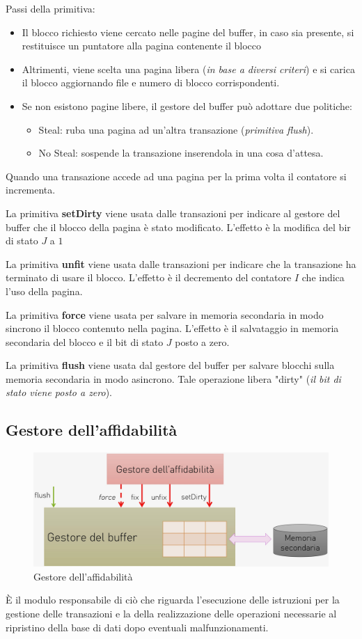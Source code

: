 \documentclass[oneside,a4paper,11pt]{book}
\theoremstyle{italicstyle}
\theoremstyle{normStyle}
\begin{document}
Passi della primitiva:
\begin{itemize}
    \item Il blocco richiesto viene cercato nelle pagine del buffer, in caso sia presente, si restituisce 
    un puntatore alla pagina contenente il blocco
    \item Altrimenti, viene scelta una pagina libera (\textit{in base a diversi criteri}) 
    e si carica il blocco aggiornando 
    file e numero di blocco corrispondenti.
    \item Se non esistono pagine libere, il gestore del buffer può adottare due politiche:
    \begin{itemize}
        \item Steal: ruba una pagina ad un'altra transazione (\textit{primitiva flush}).
        \item No Steal: sospende la transazione inserendola in una cosa d'attesa.
    \end{itemize}
\end{itemize}
Quando una transazione accede ad una pagina per la prima volta il contatore 
si incrementa.

La primitiva \textbf{setDirty} viene usata dalle transazioni per 
indicare al gestore del buffer che il blocco della pagina è stato 
modificato. L'effetto è la modifica del bir di stato $J$ a $1$

La primitiva \textbf{unfit} viene usata dalle transazioni per indicare che 
la transazione ha terminato di usare il blocco. L'effetto è il decremento 
del contatore $I$ che indica l'uso della pagina.

La primitiva \textbf{force} viene usata per salvare in memoria secondaria 
in modo sincrono il blocco contenuto nella pagina. L'effetto è il 
salvataggio in memoria secondaria del blocco e il bit di stato $J$ posto a zero.

La primitiva \textbf{flush} viene usata dal gestore del buffer per 
salvare blocchi sulla memoria secondaria in modo asincrono. Tale 
operazione libera "dirty" (\textit{il bit di stato 
viene posto a zero}).
\subsection{Gestore dell'affidabilità}
\begin{figure}[H]
    \centering
    \includegraphics[width=15cm]{img/affidabilita.jpeg}
    \caption{Gestore dell'affidabilità}
    \label{fig:affidabilita}
\end{figure}
È il modulo responsabile di ciò che riguarda l'esecuzione delle istruzioni 
per la gestione delle transazioni e la della realizzazione delle operazioni 
necessarie al ripristino della base di dati dopo eventuali malfunzionamenti.
\end{document}
